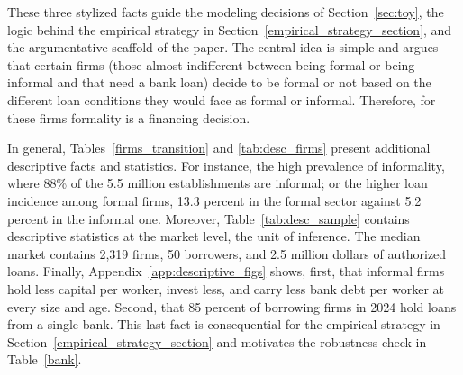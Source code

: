 \documentclass[12pt]{article}
\begin{document}
These three stylized facts guide the modeling decisions of Section~\ref{sec:toy}, the logic behind the empirical strategy in Section~\ref{empirical_strategy_section}, and the argumentative scaffold of the paper. The central idea is simple and argues that certain firms (those almost indifferent between being formal or being informal and that need a bank loan) decide to be formal or not based on the different loan conditions they would face as formal or informal. Therefore, for these firms formality is a financing decision. 

In general, Tables~\ref{firms_transition} and \ref{tab:desc_firms} present additional descriptive facts and statistics. For instance, the high prevalence of informality, where 88\% of the 5.5 million establishments are informal; or the higher loan incidence among formal firms, 13.3 percent in the formal sector against 5.2 percent in the informal one. Moreover, Table~\ref{tab:desc_sample} contains descriptive statistics at the market level, the unit of inference. The median market contains 2,319 firms, 50 borrowers, and 2.5 million dollars of authorized loans. Finally, Appendix~\ref{app:descriptive_figs} shows, first, that informal firms hold less capital per worker, invest less, and carry less bank debt per worker at every size and age. Second, that 85 percent of borrowing firms in 2024 hold loans from a single bank. This last fact is consequential for the empirical strategy in Section~\ref{empirical_strategy_section} and motivates the robustness check in Table~\ref{bank}.

%     

\end{document}
